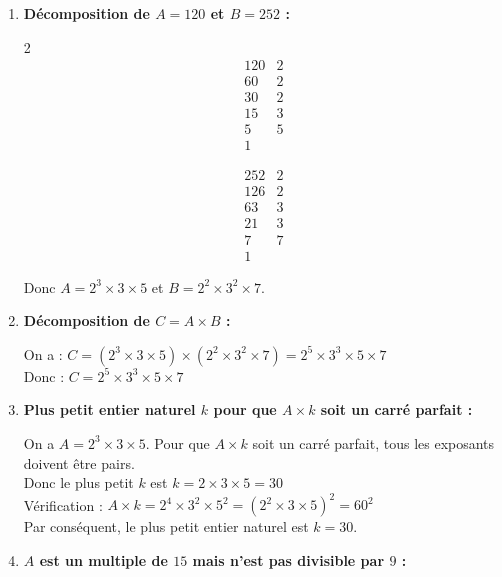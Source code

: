 \documentclass[10pt, a4paper]{article}
\begin{document}
\begin{Solution}[APPLICATION][9]
\begin{enumerate}[leftmargin=*,itemsep=0.5pt]
    \item \textbf{Décomposition de $A = 120$ et $B = 252$ :}

    \begin{multicols}{2}
    \[
    \begin{array}{r|l}
    120 & 2 \\
    60  & 2 \\
    30  & 2 \\
    15  & 3 \\
    5   & 5 \\
    1   &
    \end{array}
    \]

    \columnbreak

    \[
    \begin{array}{r|l}
    252 & 2 \\
    126 & 2 \\
    63  & 3 \\
    21  & 3 \\
    7   & 7 \\
    1   &
    \end{array}
    \]
    \end{multicols}
    Donc $A = 2^3 \times 3 \times 5$ et $B = 2^2 \times 3^2 \times 7$.

    \item \textbf{Décomposition de $C = A \times B$ :}

    On a :
        $C = (2^3 \times 3 \times 5) \times (2^2 \times 3^2 \times 7) 
          = 2^5 \times 3^3 \times 5 \times 7$ \\
    Donc : \quad $C = 2^5 \times 3^3 \times 5 \times 7$

    \item \textbf{Plus petit entier naturel $k$ pour que $A \times k$ soit un carré parfait :}

    On a $A = 2^3 \times 3 \times 5$. Pour que $A \times k$ soit un carré parfait, tous les exposants doivent être pairs. \\
    Donc le plus petit $k$ est $k = 2 \times 3 \times 5 = 30$ \\
    Vérification : $A \times k = 2^4 \times 3^2 \times 5^2 = (2^2 \times 3 \times 5)^2 = 60^2$ \\
    Par conséquent, le plus petit entier naturel est $k = 30$.

    \item \textbf{$A$ est un multiple de $15$ mais n'est pas divisible par $9$ :}


\end{enumerate}
\end{Solution}
\end{document}
